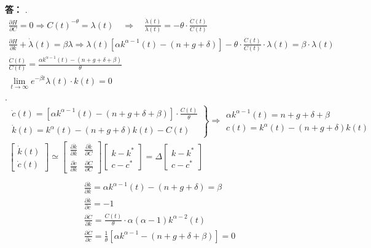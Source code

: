 \documentclass[12pt, a4paper, oneside]{article}
\newcounter{answername}
\newenvironment{answer}{\stepcounter{answername}\par\noindent\textbf{答：}\newline}{\\\par}
\begin{document}
\begin{CJK*}{UTF8}{gbsn}
\begin{answer}
.
$$
\begin{array}{l}\frac{\partial H}{\partial C}=0 \Rightarrow C(t)^{-\theta}=\lambda(t) \quad \Rightarrow \quad \frac{\dot{\lambda}(t)}{\lambda(t)}=-\theta \cdot \frac{\dot{C}(t)}{C(t)} \\ \frac{\partial H}{\partial k}+\dot{\lambda}(t)=\beta \lambda \Rightarrow \lambda(t)\left[\alpha k^{\alpha-1}(t)-(n+g+\delta)\right]-\theta \cdot \frac{\dot{C}(t)}{C(t)} \cdot \lambda(t)=\beta \cdot \lambda(t) \\ \frac{\dot{C}(t)}{C(t)}=\frac{\alpha k^{\alpha-1}(t)-(n+g+\delta+\beta)}{\theta} \\ \lim _{t \rightarrow \infty} e^{-\beta t} \lambda(t) \cdot k(t)=0\end{array}
$$
.
$$
\begin{array}{l}\left.\begin{array}{l}\dot{c}(t)=\left[\alpha k^{\alpha-1}(t)-(n+g+\delta+\beta)\right] \cdot \frac{C(t)}{\theta} \\ \dot{k}(t)=k^{\alpha}(t)-(n+g+\delta) k(t)-C(t)\end{array}\right\} \Rightarrow \begin{array}{l}\alpha k^{\alpha-1}(t)=n+g+\delta+\beta \\ c(t)=k^{\alpha}(t)-(n+g+\delta) k(t)\end{array} \\ {\left[\begin{array}{l}\dot{k}(t) \\ \dot{c}(t)\end{array}\right] \simeq\left[\begin{array}{ll}\frac{\partial \dot{k}}{\partial k} & \frac{\partial \dot{k}}{\partial C} \\ \frac{\partial \dot{c}}{\partial k} & \frac{\partial \dot{C}}{\partial C}\end{array}\right]\left[\begin{array}{l}k-k^{*} \\ c-c^{*}\end{array}\right]=\Delta\left[\begin{array}{l}k-k^{*} \\ c-c^{*}\end{array}\right]} \\\end{array}
$$
$$
\begin{array}{l}\frac{\partial \dot{k}}{\partial k}=\alpha k^{\alpha-1}(t)-(n+g+\delta)=\beta \\ \frac{\partial \dot{k}}{\partial c}=-1 \\ \frac{\partial \dot{C}}{\partial k}=\frac{C(t)}{\theta} \cdot \alpha(\alpha-1) k^{\alpha-2}(t) \\ \frac{\partial \dot{C}}{\partial c}=\frac{1}{\theta}\left[\alpha k^{\alpha-1}-(n+g+\delta+\beta)\right]=0\end{array}
$$
\end{answer}
\end{CJK*}
\end{document}
